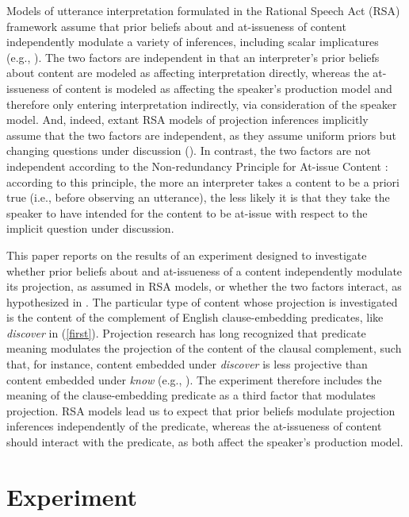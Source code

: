 \documentclass[11pt,fleqn]{article}
\newcommand{\6}{\mbox{$[\hspace*{-.6mm}[$}}
\newcommand{\9}{\mbox{$]\hspace*{-.6mm}]$}}
\begin{document}
Models of utterance interpretation formulated in the Rational Speech Act (RSA) framework assume that prior beliefs about and at-issueness of content independently modulate a variety of inferences, including scalar implicatures (e.g., \citealt{degen-goodman2014}). The two factors are independent in that an interpreter's prior beliefs about content are modeled as affecting interpretation directly, whereas the at-issueness of content is modeled as affecting the speaker's production model and therefore only entering interpretation indirectly, via consideration of the speaker model. And, indeed, extant RSA models of projection inferences implicitly assume that the two factors are independent, as they assume uniform priors but changing questions under discussion (\citealt*{qing-etal2016,stevens-etal2017}). In contrast, the two factors are not independent according to the Non-redundancy Principle for At-issue Content \citep*{tonhauser-etal-eval}: according to this principle, the more an interpreter takes a content to be a priori true (i.e., before observing an utterance), the less likely it is that they take the speaker to have intended for the content to be at-issue with respect to the implicit question under discussion.

This paper reports on the results of an experiment designed to investigate whether prior beliefs about and at-issueness of a content independently modulate its projection, as assumed in RSA models, or whether the two factors interact, as hypothesized in \citealt{tonhauser-etal-eval}. The particular type of content whose projection is investigated is the content of the complement of English clause-embedding predicates, like {\em discover} in (\ref{first}). Projection research has long recognized that predicate meaning modulates the projection of the content of the clausal complement, such that, for instance, content embedded under {\em discover} is less projective than content embedded under {\em know} (e.g., \citealt{kiparsky-kiparsky70,degen-tonhauser-language}). The experiment therefore includes the meaning of the clause-embedding predicate as a third factor that modulates projection. RSA models lead us to expect that prior beliefs modulate projection inferences independently of the predicate, whereas the at-issueness of content should interact with the predicate, as both affect the speaker's production model.

\section{Experiment}\label{s2}
\end{document}
